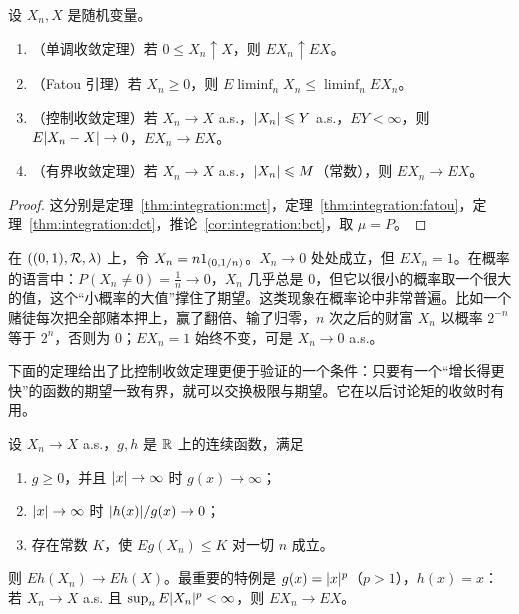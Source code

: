 \begin{theorem}[期望的极限定理]\label{thm:expectation:limits}
设 $X_n,X$ 是随机变量。
\begin{enumerate}
\item （单调收敛定理）若 $0\leqslant X_n\uparrow X$，则 $EX_n\uparrow EX$。
\item （Fatou 引理）若 $X_n\geqslant0$，则 $E\liminf_nX_n\leqslant\liminf_nEX_n$。
\item （控制收敛定理）若 $X_n\to X$ a.s.，$\lvert X_n\rvert\leqslant Y$ a.s.，$EY<\infty$，则 $E\lvert X_n-X\rvert\to0$，$EX_n\to EX$。
\item （有界收敛定理）若 $X_n\to X$ a.s.，$\lvert X_n\rvert\leqslant M$（常数），则 $EX_n\to EX$。
\end{enumerate}
\end{theorem}
\begin{proof}
这分别是定理~\ref{thm:integration:mct}，定理~\ref{thm:integration:fatou}，定理~\ref{thm:integration:dct}，推论~\ref{cor:integration:bct}，取 $\mu=P$。
\end{proof}

\begin{example}[期望的极限不等于极限的期望]\label{ex:expectation:no-interchange}
在 $((0,1),\mathcal{R},\lambda)$ 上，令 $X_n=n1_{(0,1/n)}$。$X_n\to0$ 处处成立，但 $EX_n=1$。在概率的语言中：$P(X_n\neq0)=\frac1n\to0$，$X_n$ 几乎总是 $0$，但它以很小的概率取一个很大的值，这个“小概率的大值”撑住了期望。这类现象在概率论中非常普遍。比如一个赌徒每次把全部赌本押上，赢了翻倍、输了归零，$n$ 次之后的财富 $X_n$ 以概率 $2^{-n}$ 等于 $2^n$，否则为 $0$；$EX_n=1$ 始终不变，可是 $X_n\to0$ a.s.。
\end{example}

下面的定理给出了比控制收敛定理更便于验证的一个条件：只要有一个“增长得更快”的函数的期望一致有界，就可以交换极限与期望。它在以后讨论矩的收敛时有用。

\begin{theorem}[用高阶矩控制极限★]\label{thm:expectation:moment-control}
设 $X_n\to X$ a.s.，$g,h$ 是 $\mathbb{R}$ 上的连续函数，满足
\begin{enumerate}
\item $g\geqslant0$，并且 $\lvert x\rvert\to\infty$ 时 $g(x)\to\infty$；
\item $\lvert x\rvert\to\infty$ 时 $\lvert h(x)\rvert/g(x)\to0$；
\item 存在常数 $K$，使 $Eg(X_n)\leqslant K$ 对一切 $n$ 成立。
\end{enumerate}
则 $Eh(X_n)\to Eh(X)$。最重要的特例是 $g(x)=\lvert x\rvert^p$（$p>1$），$h(x)=x$：若 $X_n\to X$ a.s. 且 $\sup_nE\lvert X_n\rvert^p<\infty$，则 $EX_n\to EX$。
\end{theorem}

